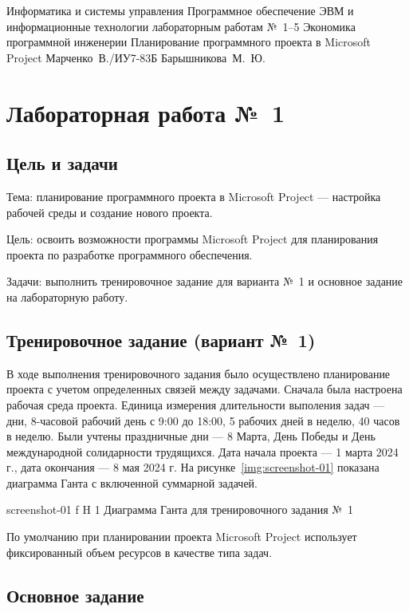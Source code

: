 \documentclass{bmstu}
\begin{document}
\makereporttitle
    {Информатика и системы управления}
    {Программное обеспечение ЭВМ и информационные технологии}
    {лабораторным работам №~1--5}
    {Экономика программной инженерии}
    {Планирование программного проекта в Microsoft Project}
    {}
    {Марченко~В./ИУ7-83Б}
    {Барышникова~М.~Ю.}

{\centering \maketableofcontents}

\chapter{Лабораторная работа №~1}

\section{Цель и задачи}

Тема: планирование программного проекта в Microsoft Project --- настройка рабочей среды и создание нового проекта.

Цель: освоить возможности программы Microsoft Project для планирования проекта по разработке программного обеспечения.

Задачи: выполнить тренировочное задание для варианта №~1 и основное задание на лабораторную работу.

\section{Тренировочное задание (вариант №~1)}

В ходе выполнения тренировочного задания было осуществлено планирование проекта с учетом определенных связей между задачами. 
Сначала была настроена рабочая среда проекта. 
Единица измерения длительности выполения задач --- дни, 8-часовой рабочий день с 9:00 до 18:00, 5 рабочих дней в неделю, 40 часов в неделю. 
Были учтены праздничные дни --- 8 Марта, День Победы и День международной солидарности трудящихся. 
Дата начала проекта --- 1 марта 2024 г., дата окончания --- 8 мая 2024 г. 
На рисунке~\ref{img:screenshot-01} показана диаграмма Ганта с включенной суммарной задачей.
    
    {screenshot-01}
    {f}
    {H}
    {1\textwidth}
    {Диаграмма Ганта для тренировочного задания №~1}
    
По умолчанию при планировании проекта Microsoft Project использует фиксированный объем ресурсов в качестве типа задач.
    
\section{Основное задание}
\end{document}
